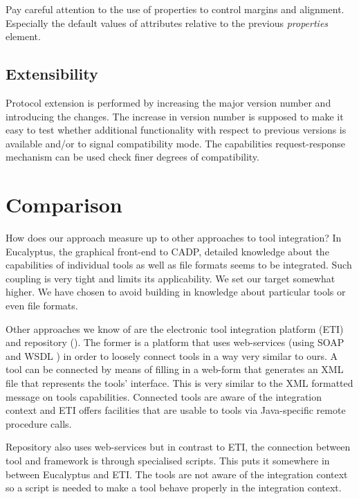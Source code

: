 \documentclass{article}
\begin{document}
  \noindent Pay careful attention to the use of properties to control margins and
  alignment. Especially the default values of attributes relative to the
  previous \textit{properties} element.

  \subsection{Extensibility}

   Protocol extension is performed by increasing the major version number and
   introducing the changes. The increase in version number is supposed to make
   it easy to test whether additional functionality with respect to previous
   versions is available and/or to signal compatibility mode. The capabilities
   request-response mechanism can be used check finer degrees of compatibility.
   
  \section{Comparison}
  
   How does our approach measure up to other approaches to tool integration?  In
   Eucalyptus, the graphical front-end to CADP, detailed knowledge about the
   capabilities of individual tools as well as file formats seems to be
   integrated. Such coupling is very tight and limits its applicability. We set
   our target somewhat higher. We have chosen to avoid building in knowledge
   about particular tools or even file formats.
   
   Other approaches we know of are the electronic tool integration platform
   (ETI) \cite{RICVT} and repository (\cite{SFAV}). The former is a platform
   that uses web-services (using SOAP \cite{SOAP} and WSDL \cite{2001-WSDL})
   in order to loosely connect tools in a way very similar to ours. A tool can
   be connected by means of filling in a web-form that generates an XML file
   that represents the tools' interface.  This is very similar to the XML
   formatted message on tools capabilities. Connected tools are aware of the
   integration context and ETI offers facilities that are usable to tools via
   Java-specific remote procedure calls.
   
   Repository also uses web-services but in contrast to ETI, the connection
   between tool and framework is through specialised scripts. This puts it
   somewhere in between Eucalyptus and ETI. The tools are not aware of the
   integration context so a script is needed to make a tool behave properly in
   the integration context.
 
\end{document}

